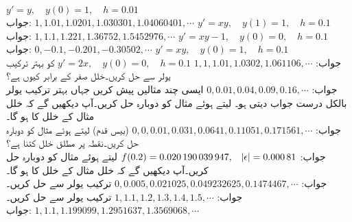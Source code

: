 \quad
$y'=y,\quad y(0)=1,\quad h=0.01$\\
جواب:\quad
$1,1.01,1.0201,1.030301,1.04060401,\cdots$
\quad
$y'=xy,\quad y(1)=1,\quad h=0.1$\\
جواب:\quad
$1,1.1,1.221,1.36752,1.5452976,\cdots$
\quad
$y'=xy-1,\quad y(0)=0,\quad h=0.1$\\
جواب:\quad
$0,-0.1,-0.201,-0.30502,\cdots$
\quad
$y'=xy,\quad y(0)=1,\quad h=0.1$\\
جواب:\quad
$1,1,1.01,1.0302,1.061106,\cdots$
\quad
$y'=2x,\quad y(0)=0,\quad h=0.1$
کو بہتر ترکیب یولر سے حل کریں۔خلل صفر کے برابر کیوں ہے؟\\
جواب:\quad
$0,0.01,0.04,0.09,0.16,\cdots$
\quad
ایسی چند مثالیں پیش کریں جہاں بہتر ترکیب یولر بالکل درست جواب دیتی ہو۔
\quad
{} لیتے ہوئے مثال  کو دوبارہ حل کریں۔آپ دیکھیں گے کہ خلل مثال  کے خلل کا  ہو گا۔\\
جواب:\quad
$0,0,0.01,0.031,0.0641,0.11051,0.171561,\cdots$
\quad
{} (بیس قدم) لیتے ہوئے مثال  کو دوبارہ حل کریں۔نقطہ  پر مطلق خلل کتنا ہے؟\\
جواب:\quad
$f(0.2)=\num{0.020190039947}, \quad \abs{\epsilon}=\num{0.00081}$
\quad
{} لیتے ہوئے مثال  کو دوبارہ حل کریں۔آپ دیکھیں گے کہ خلل  مثال  کے خلل کا  ہو گا۔\\
جواب:\quad
$0,\num{0.005},\num{0.021025},\num{0.049232625},\num{0.1474467},\cdots$
\quad
ترکیب یولر سے  حل کریں۔\\
جواب:\quad
$1,1.1,1.2,1.3,1.4,1.5,\cdots$
\quad
ترکیب یولر سے  حل کریں۔\\
جواب:\quad
$1,1.1,1.199099,1.2951637,1.3569068,\cdots$
